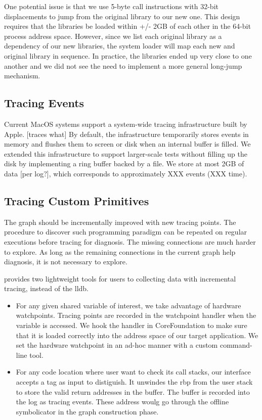 One potential issue is that we use 5-byte call instructions with 32-bit displacements to jump from the original library to our new one.
This design requires that the libraries be loaded within +/- 2GB of each other in the 64-bit process address space.
However, since we list each original library as a dependency of our new libraries, the system loader will map each new and original library in sequence.
In practice, the libraries ended up very close to one another and we did not see the need to implement a more general long-jump mechanism.

\subsection{Tracing Events}
Current MacOS systems support a system-wide tracing infrastructure built by Apple. [traces what]
By default, the infrastructure temporarily stores events in memory and flushes them to screen or disk when an internal buffer is filled.
We extended this infrastructure to support larger-scale tests without filling up the disk by implementing a ring buffer backed by a file.
We store at most 2GB of data [per log?], which corresponds to approximately XXX events (XXX time).

\subsection{Tracing Custom Primitives}
The graph should be incrementally improved with new tracing points.
The procedure to discover such programming paradigm can be repeated on regular executions before tracing for diagnosis.
The missing connections are much harder to explore.
As long as the remaining connections in the current graph help diagnosis, it is not necessary to explore.

\xxx provides two lightweight tools for users to collecting data with incremental tracing, instead of the lldb.
\begin {itemize}
\item For any given shared variable of interest, we take advantage of hardware watchpoints.
	Tracing points are recorded in the watchpoint handler when the variable is accessed.
	We hook the handler in CoreFoundation to make sure that it is loaded correctly into the address space of our target application.
	We set the hardware watchpoint in an ad-hoc manner with a custom command-line tool.
\item For any code location where user want to check its call stacks, our interface accepts a tag as input to distiguish.
	It unwindes the rbp from the user stack to store the valid return addresses in the buffer. The buffer is recorded into the log as tracing events.
	These address woulg go through the offline symbolicator in the graph construction phase.
\end{itemize}

